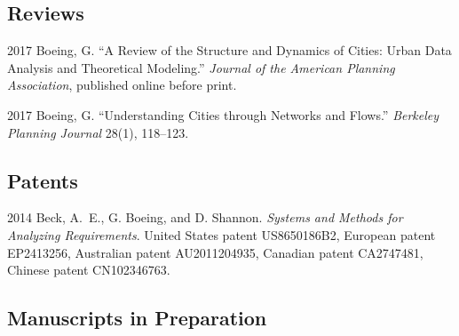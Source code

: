 \documentclass{academiccv}
\begin{document}
\subsection*{Reviews}

\begin{tablist}
	
\item[2017] \tab Boeing, G. \enquote{A Review of the Structure and Dynamics of Cities: Urban Data Analysis and Theoretical Modeling.} \emph{Journal of the American Planning Association}, published online before print.
	
\item[2017] \tab Boeing, G. \enquote{Understanding Cities through Networks and Flows.} \emph{Berkeley Planning Journal} 28(1), 118--123.
	
\end{tablist}



\subsection*{Patents}

\begin{tablist}

\item[2014] \tab Beck, A.~E., G. Boeing, and D. Shannon. \emph{Systems and Methods for Analyzing Requirements}. United States patent US8650186B2, European patent EP2413256, Australian patent AU2011204935, Canadian patent CA2747481, Chinese patent CN102346763.

\end{tablist}



\subsection*{Manuscripts in Preparation}
\end{document}
